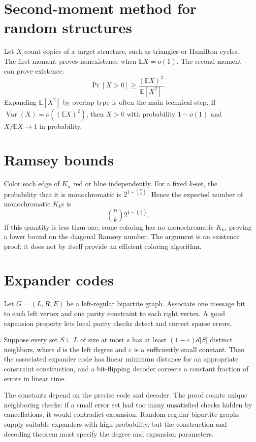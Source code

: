 \section{Second-moment method for random structures}

Let $X$ count copies of a target structure, such as triangles or Hamilton
cycles.  The first moment proves nonexistence when $\mathbb{E}X=o(1)$.  The
second moment can prove existence:
\[
 \Pr[X>0]\geq\frac{(\mathbb{E}X)^2}{\mathbb{E}[X^2]}.
\]
Expanding $\mathbb{E}[X^2]$ by overlap type is often the main technical step.
If $\operatorname{Var}(X)=o((\mathbb{E}X)^2)$, then $X>0$ with probability
$1-o(1)$ and $X/\mathbb{E}X\to1$ in probability.

\section{Ramsey bounds}

Color each edge of $K_n$ red or blue independently.  For a fixed $k$-set,
the probability that it is monochromatic is
$2^{1-\binom{k}{2}}$.  Hence the expected number of monochromatic $K_k$s is
\[
 \binom nk 2^{1-\binom{k}{2}}.
\]
If this quantity is less than one, some coloring has no monochromatic
$K_k$, proving a lower bound on the diagonal Ramsey number.  The argument is
an existence proof; it does not by itself provide an efficient coloring
algorithm.

\section{Expander codes}

Let $G=(L,R,E)$ be a left-regular bipartite graph.  Associate one message
bit to each left vertex and one parity constraint to each right vertex.  A
good expansion property lets local parity checks detect and correct sparse
errors.

\begin{theorem}
Suppose every set $S\subseteq L$ of size at most $s$ has at least
$(1-\varepsilon)d|S|$ distinct neighbors, where $d$ is the left degree and
$\varepsilon$ is a sufficiently small constant.  Then the associated
expander code has linear minimum distance for an appropriate constraint
construction, and a bit-flipping decoder corrects a constant fraction of
errors in linear time.
\end{theorem}

The constants depend on the precise code and decoder.  The proof counts
unique neighboring checks: if a small error set had too many unsatisfied
checks hidden by cancellations, it would contradict expansion.  Random
regular bipartite graphs supply suitable expanders with high probability, but
the construction and decoding theorem must specify the degree and expansion
parameters.

